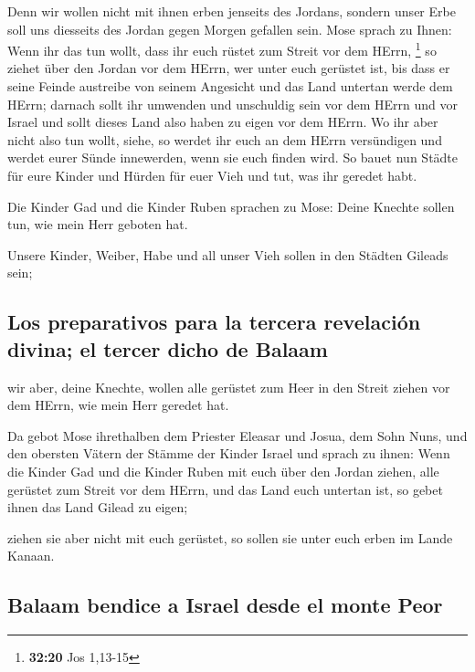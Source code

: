  Denn wir wollen nicht mit ihnen erben jenseits des
Jordans, sondern unser Erbe soll uns diesseits des Jordan gegen Morgen
gefallen sein.  Mose sprach zu Ihnen: Wenn ihr das tun
wollt, dass ihr euch rüstet zum Streit vor dem HErrn, \footnote{\textbf{32:20}
  Jos 1,13-15}  so ziehet über den Jordan vor dem HErrn,
wer unter euch gerüstet ist, bis dass er seine Feinde austreibe von
seinem Angesicht  und das Land untertan werde dem HErrn;
darnach sollt ihr umwenden und unschuldig sein vor dem HErrn und vor
Israel und sollt dieses Land also haben zu eigen vor dem HErrn.
 Wo ihr aber nicht also tun wollt, siehe, so werdet ihr
euch an dem HErrn versündigen und werdet eurer Sünde innewerden, wenn
sie euch finden wird.  So bauet nun Städte für eure
Kinder und Hürden für euer Vieh und tut, was ihr geredet habt.

 Die Kinder Gad und die Kinder Ruben sprachen zu Mose:
Deine Knechte sollen tun, wie mein Herr geboten hat.

 Unsere Kinder, Weiber, Habe und all unser Vieh sollen in
den Städten Gileads sein;

\hypertarget{los-preparativos-para-la-tercera-revelaciuxf3n-divina-el-tercer-dicho-de-balaam}{%
\subsection{Los preparativos para la tercera revelación divina; el
tercer dicho de
Balaam}\label{los-preparativos-para-la-tercera-revelaciuxf3n-divina-el-tercer-dicho-de-balaam}}

 wir aber, deine Knechte, wollen alle gerüstet zum Heer
in den Streit ziehen vor dem HErrn, wie mein Herr geredet hat.

 Da gebot Mose ihrethalben dem Priester Eleasar und
Josua, dem Sohn Nuns, und den obersten Vätern der Stämme der Kinder
Israel  und sprach zu ihnen: Wenn die Kinder Gad und die
Kinder Ruben mit euch über den Jordan ziehen, alle gerüstet zum Streit
vor dem HErrn, und das Land euch untertan ist, so gebet ihnen das Land
Gilead zu eigen;

 ziehen sie aber nicht mit euch gerüstet, so sollen sie
unter euch erben im Lande Kanaan.

\hypertarget{balaam-bendice-a-israel-desde-el-monte-peor}{%
\subsection{Balaam bendice a Israel desde el monte
Peor}\label{balaam-bendice-a-israel-desde-el-monte-peor}}

